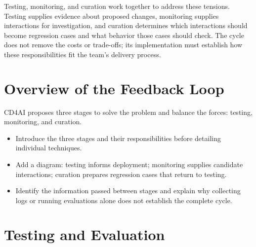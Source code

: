 Testing, monitoring, and curation work together to address these tensions.
Testing supplies evidence about proposed changes, monitoring supplies
interactions for investigation, and curation determines which interactions
should become regression cases and what behavior those cases should check.
The cycle does not remove the costs or trade-offs; its implementation must
establish how these responsibilities fit the team's delivery process.


\section{Overview of the Feedback Loop}
\label{sec:cd4ai-overview}

CD4AI proposes three stages to solve the problem and balance the forces:
testing, monitoring, and curation.



\begin{itemize}


  \item Introduce the three stages and their responsibilities before detailing
    individual techniques.
  \item Add a diagram: testing informs deployment; monitoring supplies candidate
    interactions; curation prepares regression cases that return to testing.
  \item Identify the information passed between stages and explain why collecting
    logs or running evaluations alone does not establish the complete cycle.
\end{itemize}

\section{Testing and Evaluation}
\label{sec:cd4ai-testing}

